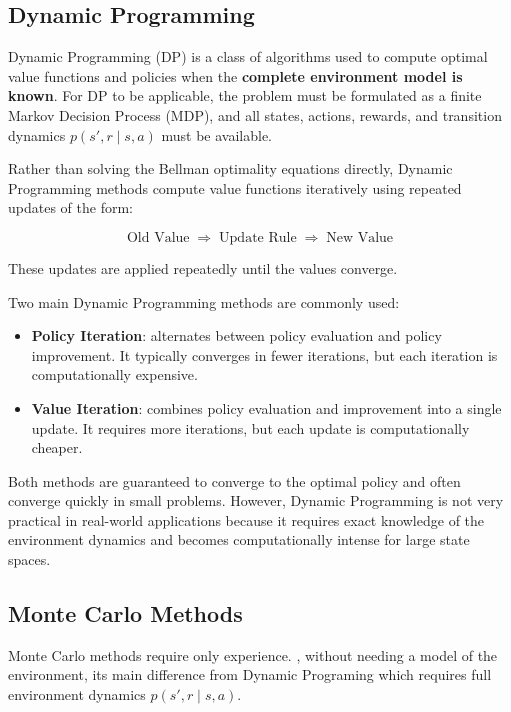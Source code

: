 \subsection{Dynamic Programming}

Dynamic Programming (DP) is a class of algorithms used to compute optimal value functions and policies when the \textbf{complete environment model is known}. For DP to be applicable, the problem must be formulated as a finite Markov Decision Process (MDP), and all states, actions, rewards, and transition dynamics $p(s', r \mid s, a)$ must be available.

Rather than solving the Bellman optimality equations directly, Dynamic Programming methods compute value functions iteratively using repeated updates of the form:

\[
\text{Old Value} \;\Rightarrow\; \text{Update Rule} \;\Rightarrow\; \text{New Value}
\]

These updates are applied repeatedly until the values converge.

Two main Dynamic Programming methods are commonly used:

\begin{itemize}

  \item \textbf{Policy Iteration}: alternates between policy evaluation and policy improvement. It typically converges in fewer iterations, but each iteration is computationally expensive.

  \item \textbf{Value Iteration}: combines policy evaluation and improvement into a single update. It requires more iterations, but each update is computationally cheaper.

\end{itemize}

Both methods are guaranteed to converge to the optimal policy and often converge quickly in small problems. However, Dynamic Programming is not very practical in real-world applications because it requires exact knowledge of the environment dynamics and becomes computationally intense for large state spaces.



\subsection{Monte Carlo Methods}

Monte Carlo methods require only experience. \cite{sutton}, without needing a model of the environment, its main difference from Dynamic Programing which requires full environment dynamics $p(s', r \mid s, a)$. 




